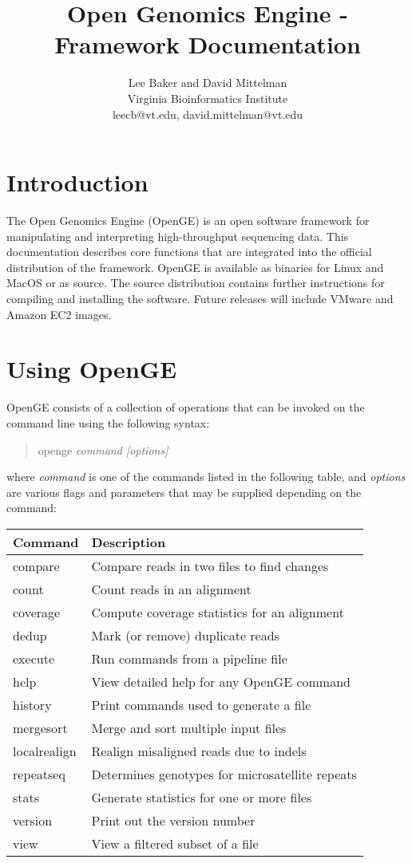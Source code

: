 \documentclass[11pt]{article}
\newcommand {\cmd}[1] {\begin{quote}#1\end{quote}}
\begin{document}
\title{Open Genomics Engine - Framework Documentation}
\author{Lee Baker and David Mittelman\\
Virginia Bioinformatics Institute \\
leecb@vt.edu, david.mittelman@vt.edu}
\maketitle

\section {Introduction}
The Open Genomics Engine (OpenGE) is an open software framework for manipulating and interpreting high-throughput sequencing data. This documentation describes core functions that are integrated into the official distribution of the framework. OpenGE is available as binaries for Linux and MacOS or as source. The source distribution contains further instructions for compiling and installing the software. Future releases will include VMware and Amazon EC2 images.
\section {Using OpenGE}
OpenGE consists of a collection of operations that can be invoked on the command line using the following syntax:

\cmd{openge \textit{command [options]}}

where \textit{command} is one of the commands listed in the following table, and \textit{options} are various flags and parameters that may be supplied depending on the command:

\begin{center}
\begin{tabular}{lp{3.5in}}
\hline
Command&Description\\ \hline
compare&Compare reads in two files to find changes\\
count&Count reads in an alignment\\
coverage&Compute coverage statistics for an alignment\\
dedup&Mark (or remove) duplicate reads\\
execute&Run commands from a pipeline file\\
help&View detailed help for any OpenGE command\\
history&Print commands used to generate a file\\
mergesort&Merge and sort multiple input files\\
localrealign&Realign misaligned reads due to indels\\
repeatseq&Determines genotypes for microsatellite repeats\\
stats&Generate statistics for one or more files\\
version&Print out the version number\\
view&View a filtered subset of a file\\
\end{tabular}
\end{center}
\end{document}
